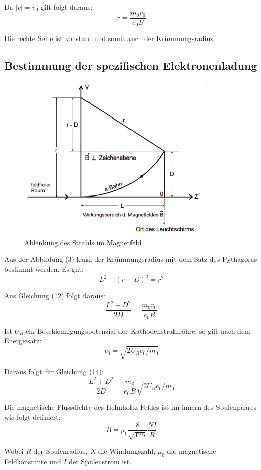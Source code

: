 Da $|v| = v_0$ gilt folgt daraus:
\begin{equation}
  r = \frac{m_0 v_0}{e_0 B}
\end{equation}

Die rechte Seite ist konstant und somit auch der Krümmungsradius.


\subsection{Bestimmung der spezifischen Elektronenladung}

\begin{figure}[H]
  \centering
  \includegraphics[height=8cm]{ablenkungbfeld.PNG}
  \caption{Ablenkung des Strahls im Magnetfeld}
  \label{fig:ablenkungbfeld}
\end{figure}

Aus der Abbildung (3) kann der Krümmungsradius mit dem Satz des Pythagoras bestimmt werden.
Es gilt:
\begin{equation}
  L^2 + (r - D)^2 = r^2
\end{equation}

Aus Gleichung (12) folgt daraus:
\begin{equation}
  \frac{L^2 + D^2}{2D} = \frac{m_0 v_0}{e_0 B}
\end{equation}

Ist $U_B$ ein Beschleunigungspotenzial der Kathodenstrahlröhre, so gilt nach dem Energiesatz:
\begin{equation}
  v_0 = \sqrt{2U_B e_0/m_0}
\end{equation}

Daraus folgt für Gleichung (14):
\begin{equation}
  \frac{L^2 + D^2}{2D} = \frac{m_0}{e_0 B} \sqrt{2U_B e_0/m_0}
\end{equation}

Die magnetische Flussdichte des Helmholtz-Feldes ist im innern des Spulenpaares wie folgt definiert:
\begin{equation}
  B = \mu_0 \frac{8}{\sqrt{125}} \frac{NI}{R}
\end{equation}

Wobei $R$ der Spulenradius, $N$ die Windungszahl, $\mu_0$ die magnetische Feldkonstante und
$I$ der Spulenstrom ist.

